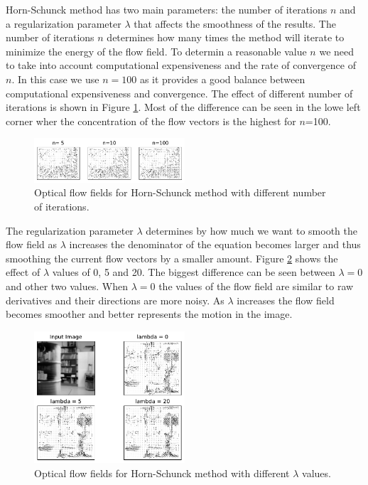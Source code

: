 \documentclass[9pt]{IEEEtran}
\begin{document}
Horn-Schunck method has two main parameters: the number of iterations $n$ and a regularization parameter $\lambda$ that affects the smoothness of the results.
The number of iterations $n$ determines how many times the method will iterate to minimize the energy of the flow field.
To determin a reasonable value $n$ we need to take into account computational expensiveness and the rate of convergence of $n$.
In this case we use $n=100$ as it provides a good balance between computational expensiveness and convergence.
The effect of different number of iterations is shown in Figure \ref{hs-iterations}.
Most of the difference can be seen in the lowe left corner wher the concentration of the flow vectors is the highest for $n$=100.
\begin{figure}[H]
    \centering
    \includegraphics[width=0.5\textwidth]{HS_iter.pdf}
    \vspace{-15px}
    \caption{Optical flow fields for Horn-Schunck method with different number of iterations.}
    \label{hs-iterations}
\end{figure}

The regularization parameter $\lambda$ determines by how much we want to smooth the flow field as $\lambda$ increases the denominator of the equation becomes larger and thus smoothing the current flow vectors by a smaller amount.
Figure \ref{hs-lambda} shows the effect of $\lambda$ values of 0, 5 and 20. 
The biggest difference can be seen between $\lambda=0$ and other two values.
When $\lambda=0$ the values of the flow field are similar to raw derivatives and their directions are more noisy.
As $\lambda$ increases the flow field becomes smoother and better represents the motion in the image.
\begin{figure}[H]
    \centering
    \includegraphics[width=0.5\textwidth]{HS_lambda.pdf}
    \vspace{-15px}
    \caption{Optical flow fields for Horn-Schunck method with different $\lambda$ values.}
    \label{hs-lambda}
\end{figure}
\end{document}
